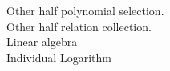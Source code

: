 \documentclass[preview]{standalone}
\begin{document}
Other half polynomial selection.\\Other half relation collection.\\Linear algebra\\Individual Logarithm\\
\end{document}
